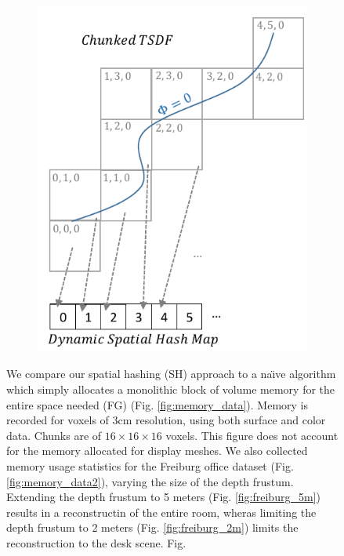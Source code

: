 \documentclass[10pt,twocolumn,letterpaper]{article}
\begin{document}
\begin{figure}
\begin{minipage}{0.23\linewidth}
\begin{subfigure}{\linewidth}
 	    \includegraphics[width=1.0\textwidth]{img/chunks.pdf}
 	      \caption{}
 	  	\label{fig:chunks} 
 	  \end{subfigure} 
   \end{minipage}
  \caption{ We compare our spatial hashing (SH)
      approach to a na\"{\i}ve algorithm which simply allocates a monolithic
      block of volume memory for the entire space needed (FG) (Fig.
      \ref{fig:memory_data}).
      Memory is recorded for voxels of 3cm resolution, using both surface and
      color data. Chunks are of $16 \times 16 \times 16$ voxels. This figure
      does not account for the memory allocated for display meshes. We also collected memory
      usage statistics for the Freiburg \cite{FREIBURG} office dataset (Fig.
      \ref{fig:memory_data2}), varying the size of the depth frustum. Extending
      the depth frustum to 5 meters (Fig. \ref{fig:freiburg_5m}) results in a reconstructin of the entire
      room, wheras limiting the depth frustum to 2 meters (Fig.
      \ref{fig:freiburg_2m}) limits the reconstruction to the desk scene. Fig.
}
\end{figure}
\end{document}
